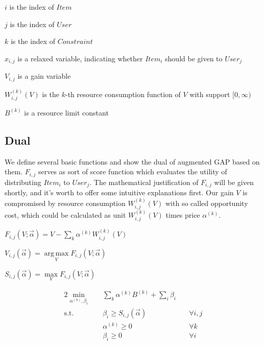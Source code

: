 \documentclass[sigconf]{acmart}
\DeclareMathOperator*{\argmax}{arg\,max}
\newcommand{\sumi}{\sum\limits_i}
\newcommand{\sumk}{\sum\limits_k}
\newcommand{\sx}{x_{i,j}}
\newcommand{\sV}{V_{i,j}}
\newcommand{\sW}{W_{i,j}^{(k)}}
\newcommand{\sB}{B^{(k)}}
\newcommand{\salpha}{\alpha^{(k)}}
\newcommand{\sbeta}{\beta_i}
\newcommand{\sF}{F_{i,j}}
\newcommand{\sS}{S_{i,j}}
\newcommand{\valpha}{\vec{\alpha}}
\newcommand{\scoreconstraint}{\sbeta \ge \sS(\vec{\alpha})}
\begin{document}
$i$ is the index of $Item$

$j$ is the index of $User$

$k$ is the index of $Constraint$

$\sx$ is a relaxed variable, indicating whether $Item_i$ should be given to $User_j$

$\sV$ is a gain variable

$\sW(V)$ is the $k$-th resource consumption function of $V$ with support $[0, \infty)$

$\sB$ is a resource limit constant

\subsection{Dual}

We define several basic functions and show the dual of augmented GAP based on them.
$\sF$ serves as sort of score function which evaluates the utility of distributing $Item_i$ to $User_j$.
The mathematical justification of $\sF$ will be given shortly, and it's worth to offer some intuitive explanations first.
Our gain $V$ is compromised by resource consumption $\sW(V)$ with so called opportunity cost,
    which could be calculated as unit $\sW(V)$ times price $\salpha$.

\begin{definition}
$\sF(V; \valpha) = V - \sumk \salpha \sW(V)$
\end{definition}

\begin{definition}
$\sV(\valpha) = \argmax\limits_V \sF(V; \valpha)$
\end{definition}

\begin{definition}
$\sS(\valpha) = \max\limits_V \sF(V; \valpha)$
\end{definition}

\begin{alignat}{2}
    \min\limits_{\salpha, \sbeta} \quad & \sumk \salpha \sB + \sumi \sbeta \quad   & {} \\
    \mbox{s.t.} \quad                   & \scoreconstraint \quad                   & \forall i,j \\
    \quad                               & \salpha \ge 0 \quad                      & \forall k \\
    \quad                               & \sbeta \ge 0 \quad                       & \forall i
\end{alignat}
\end{document}
